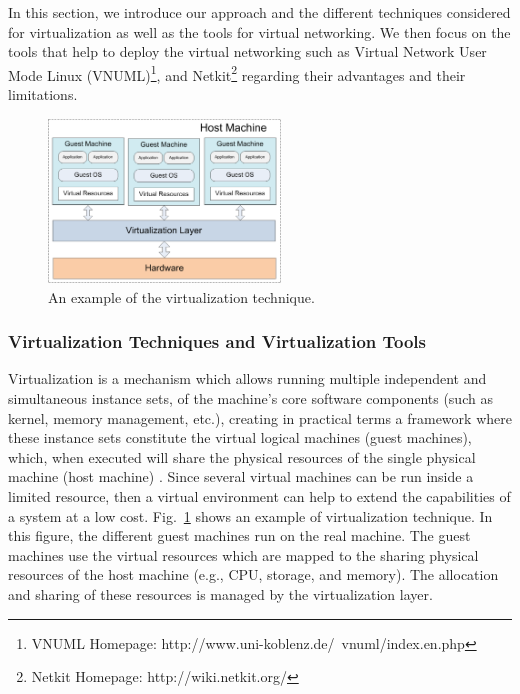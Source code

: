 In this section, we introduce our approach and the different techniques considered for virtualization as well as the tools for virtual networking. We then focus on the tools that help to deploy the virtual networking such as Virtual Network User Mode Linux (VNUML)\footnote{VNUML Homepage: http://www.uni-koblenz.de/~vnuml/index.en.php}, and Netkit\footnote{Netkit Homepage: http://wiki.netkit.org/} regarding their advantages and their limitations.  
\begin{figure}[tb!] 
  \begin{center} 
    \includegraphics[width=0.55\textwidth]{./Part1/Chapter3/figures/c5_virtualization_technique.eps} 
    \caption{An example of the virtualization technique.}
    \label{fig:c5_virtualization_technique}
  \end{center} 
\end{figure}  

\subsubsection{Virtualization Techniques and Virtualization Tools}
Virtualization is a mechanism which allows running multiple independent and simultaneous instance sets, of the machine’s core software components (such as kernel, memory management, etc.), creating in practical terms a framework where these instance sets constitute the virtual logical machines (guest machines), which, when executed will share the physical resources of the single physical machine (host machine) \cite{virtualization_concepts, VMWare_whitepaper}. Since several virtual machines can be run inside a limited resource, then a virtual environment can help to extend the capabilities of a system at a low cost. Fig.~\ref{fig:c5_virtualization_technique} shows an example of virtualization technique. In this figure, the different guest machines run on the real machine. The guest machines use the virtual resources which are mapped to the sharing physical resources of the host machine (e.g., CPU, storage, and memory). The allocation and sharing of these resources is managed by the virtualization layer.

